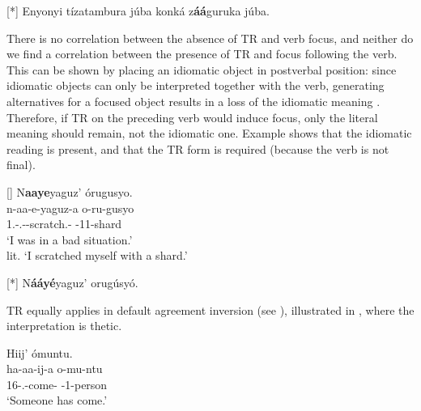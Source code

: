 \documentclass[output=paper]{langscibook}
\begin{document}
\ex
\begin{xlist}[TR]
\exi{~}
[*]{
\label{bkm:Ref99002400:b}
Enyonyi tízatambura júba konká z\textbf{áá}guruka júba.  \\
}
\end{xlist}
\z
\z

There is no correlation between the absence of TR and verb focus, and neither do we find a correlation between the presence of TR and focus following the verb. This can be shown by placing an idiomatic object in postverbal position: since idiomatic objects can only be interpreted together with the verb, generating alternatives for a focused object results in a loss of the idiomatic meaning \citep{vanderWal2021}. Therefore,  if TR on the preceding verb would induce focus, only the literal meaning should remain, not the idiomatic one. Example  shows that the idiomatic reading is present, and that the TR form is required (because the verb is not final).

\ea
\label{bkm:Ref99002946}
\ea
\begin{xlist}[TR]
[]{
N\textbf{aaye}yaguz’ órugusyo.\\
\gll
n-aa-e-yaguz-a  o-ru-gusyo\\
1\SG{}.\SM{}-\N{}.\PST{}-\REFL{}-scratch.\CAUS{}-\FV{}  \AUG{}-11-shard\\
\glt
‘I was in a bad situation.’\\
      lit. ‘I scratched myself with a shard.’
}

\end{xlist}

\ex
\begin{xlist}[TR]
\exi{~}
[*]{
N\textbf{ááyé}yaguz’ orugúsyó.
}
\end{xlist}
\z
\z


TR equally applies in default agreement inversion (see ), illustrated in , where the interpretation is thetic.

\ea
\label{bkm:Ref99003032}
\begin{xlist}[TR]
Hiij’ ómuntu.\\
\gll
ha-aa-ij-a  o-mu-ntu\\
16\SM{}-\N{}.\PST{}-come-\FV{}  \AUG{}-1-person\\
\glt
‘Someone has come.’\\

\end{xlist}
\end{document}
